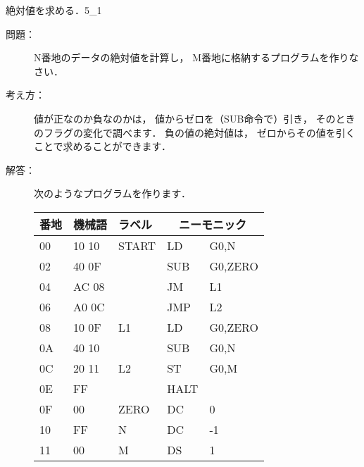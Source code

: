 \newpage
\begin{reidai}{絶対値を求める．}{5_1}
  \begin{description}

  \item[問題：]
    N番地のデータの絶対値を計算し，
    M番地に格納するプログラムを作りなさい．

  \item[考え方：]
    値が正なのか負なのかは，
    値からゼロを（SUB命令で）引き，
    そのときのフラグの変化で調べます．
    負の値の絶対値は，
    ゼロからその値を引くことで求めることができます．

  \item[解答：]次のようなプログラムを作ります．

    \begin{center}
    \end{center}

    \begin{center}
      {\footnotesize\ttfamily
        \begin{tabular}{|l|l|l|l l|}
          \hline
          番地 & 機械語 & ラベル & \multicolumn{2}{|c|}{ニーモニック} \\
          \hline
          00 & 10 10 & START& LD   & G0,N    \\
          02 & 40 0F &      & SUB  & G0,ZERO \\
          04 & AC 08 &      & JM   & L1      \\
          06 & A0 0C &      & JMP  & L2      \\
          08 & 10 0F & L1   & LD   & G0,ZERO \\
          0A & 40 10 &      & SUB  & G0,N    \\
          0C & 20 11 & L2   & ST   & G0,M    \\
          0E & FF    &      & HALT &         \\
          0F & 00    & ZERO & DC   & 0       \\
          10 & FF    & N    & DC   & -1      \\
          11 & 00    & M    & DS   & 1       \\
          \hline
        \end{tabular}
      }
    \end{center}


\end{description}
\end{reidai}
